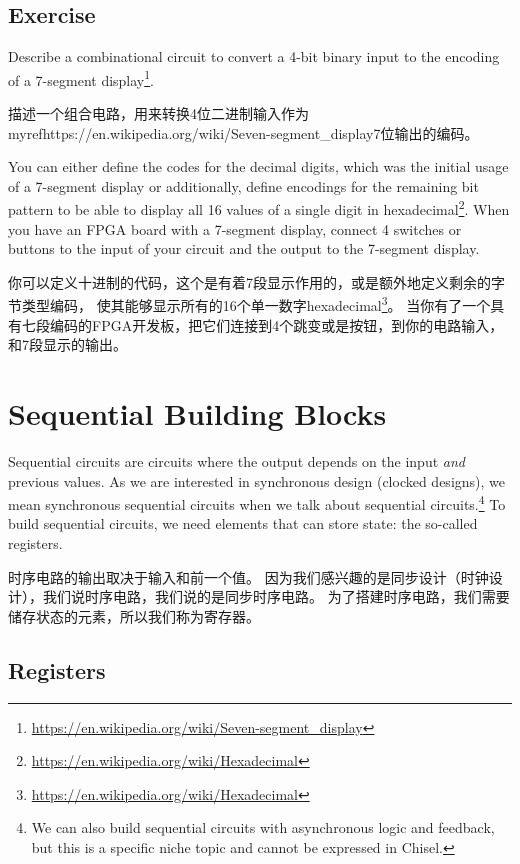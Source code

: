 \documentclass[%
    10pt,
    headinclude, footexclude,
    openright, %
    notitlepage,
    cleardoubleempty,
    headsepline,
    pointlessnumbers,
    bibtotoc, idxtotoc,
    ]{scrbook}
\newcommand{\myref}[2]{\href{#1}{#2}}
\renewcommand{\myref}[2]{{#2}{\footnote{\url{#1}}}}
\begin{document}

\section{Exercise}

Describe a combinational circuit to convert a 4-bit binary input to the encoding of a
\myref{https://en.wikipedia.org/wiki/Seven-segment_display}{7-segment display}.

描述一个组合电路，用来转换4位二进制输入作为myref{https://en.wikipedia.org/wiki/Seven-segment_display}{7位输出}的编码。

You can either define the codes for the decimal digits, which was the initial
usage of a 7-segment display or additionally, define encodings for the remaining bit pattern
to be able to display all 16 values of a single digit in
\myref{https://en.wikipedia.org/wiki/Hexadecimal}{hexadecimal}.
When you have an FPGA board with a 7-segment display, connect 4 switches or
buttons to the input of your circuit and the output to the 7-segment display.

你可以定义十进制的代码，这个是有着7段显示作用的，或是额外地定义剩余的字节类型编码，
使其能够显示所有的16个单一数字\myref{https://en.wikipedia.org/wiki/Hexadecimal}{hexadecimal}。
当你有了一个具有七段编码的FPGA开发板，把它们连接到4个跳变或是按钮，到你的电路输入，和7段显示的输出。

\chapter{Sequential Building Blocks}

Sequential circuits are circuits where the output depends on the input \emph{and}
previous values. As we are interested in synchronous design (clocked designs),
we mean synchronous sequential circuits when we talk about sequential
circuits.\footnote{We can also build sequential circuits with asynchronous logic and
feedback, but this is a specific niche topic and cannot be expressed in Chisel.}
To build sequential circuits, we need elements that can store state:
the so-called registers.

时序电路的输出取决于输入和前一个值。
因为我们感兴趣的是同步设计（时钟设计），我们说时序电路，我们说的是同步时序电路。
为了搭建时序电路，我们需要储存状态的元素，所以我们称为寄存器。

\section{Registers}
\end{document}

